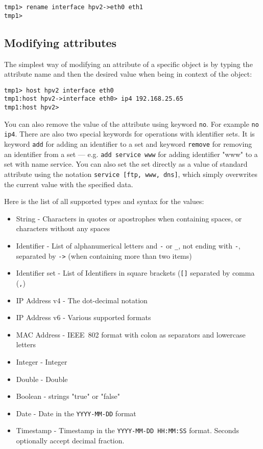 \documentclass[deska]{subfiles}
\begin{document}
\begin{verbatim}
tmp1> rename interface hpv2->eth0 eth1
tmp1>
\end{verbatim}

\subsection{Modifying attributes}

The simplest way of modifying an attribute of a specific object is by typing the attribute name and then the desired value
when being in context of the object:

\begin{verbatim}
tmp1> host hpv2 interface eth0
tmp1:host hpv2->interface eth0> ip4 192.168.25.65
tmp1:host hpv2>
\end{verbatim}

You can also remove the value of the attribute using keyword {\tt no}. For example {\tt no ip4}. There are also two special
keywords for operations with identifier sets. It is keyword {\tt add} for adding an identifier to a set and keyword
{\tt remove} for removing an identifier from a set --- e.g. {\tt add service www} for adding identifier "www" to a set
with name service. You can also set the set directly as a value of standard attribute using the notation {\tt service [ftp, www,
dns]}, which simply overwrites the current value with the specified data.

Here is the list of all supported types and syntax for the values:

\begin{itemize}
    \item{String} - Characters in quotes or apostrophes when containing spaces, or characters without any spaces
    \item{Identifier} - List of alphanumerical letters and {\tt -} or {\tt \_}, not ending with {\tt -}, separated by
        {\tt ->} (when containing more than two items)
    \item{Identifier set} - List of Identifiers in square brackets ({\tt []} separated by comma ({\tt ,})
    \item{IP Address v4} - The dot-decimal notation~\cite{ipv4-dot-decimal}
    \item{IP Address v6} - Various supported formats~\cite{rfc5952}
    \item{MAC Address} - IEEE~802 format with colon as separators and lowercase letters
    \item{Integer} - Integer
    \item{Double} - Double
    \item{Boolean} - strings "true" or "false"
    \item{Date} - Date in the {\tt YYYY-MM-DD} format
    \item{Timestamp} - Timestamp in the {\tt YYYY-MM-DD HH:MM:SS} format.  Seconds optionally accept decimal fraction.
\end{itemize}
\end{document}
